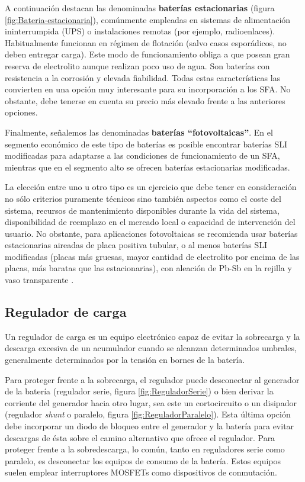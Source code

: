 A continuación destacan las denominadas \textbf{baterías estacionarias}
(figura \ref{fig:Bateria-estacionaria}), comúnmente empleadas
en sistemas de alimentación ininterrumpida (UPS) o instalaciones remotas
(por ejemplo, radioenlaces). Habitualmente funcionan en régimen de
flotación (salvo casos esporádicos, no deben entregar carga). Este
modo de funcionamiento obliga a que posean gran reserva de electrolito
aunque realizan poco uso de agua. Son baterías con resistencia a la
corrosión y elevada fiabilidad. Todas estas características las convierten
en una opción muy interesante para su incorporación a los SFA. No
obstante, debe tenerse en cuenta su precio más elevado frente a las
anteriores opciones.

Finalmente, señalemos las denominadas \textbf{baterías {}``fotovoltaicas''}.
En el segmento económico de este tipo de baterías es posible encontrar
baterías SLI modificadas para adaptarse a las condiciones de funcionamiento
de un SFA, mientras que en el segmento alto se ofrecen baterías estacionarias
modificadas.

La elección entre uno u otro tipo es un ejercicio que debe tener en
consideración no sólo criterios puramente técnicos sino también aspectos
como el coste del sistema, recursos de mantenimiento disponibles durante
la vida del sistema, disponibilidad de reemplazo en el mercado local
o capacidad de intervención del usuario. No obstante, para aplicaciones
fotovoltaicas se recomienda usar baterías estacionarias aireadas de
placa positiva tubular, o al menos baterías SLI modificadas (placas
más gruesas, mayor cantidad de electrolito por encima de las placas,
más baratas que las estacionarias), con aleación de Pb-Sb en la rejilla
y vaso transparente \citep{Egido.Lorenzo1998}.


\subsection{Regulador de carga}

Un regulador de carga es un equipo electrónico capaz de evitar la
sobrecarga y la descarga excesiva de un acumulador cuando se alcanzan
determinados umbrales, generalmente determinados por la tensión en
bornes de la batería. 

Para proteger frente a la sobrecarga, el regulador puede desconectar
al generador de la batería (regulador serie, figura \ref{fig:ReguladorSerie})
o bien derivar la corriente del generador hacia otro lugar, sea este
un cortocircuito o un disipador (regulador \emph{shunt} o paralelo,
figura \ref{fig:ReguladorParalelo}). Esta última opción debe incorporar
un diodo de bloqueo entre el generador y la batería para evitar descargas
de ésta sobre el camino alternativo que ofrece el regulador. Para
proteger frente a la sobredescarga, lo común, tanto en reguladores
serie como paralelo, es desconectar los equipos de consumo de la batería.
Estos equipos suelen emplear interruptores MOSFETs como dispositivos
de conmutación.

